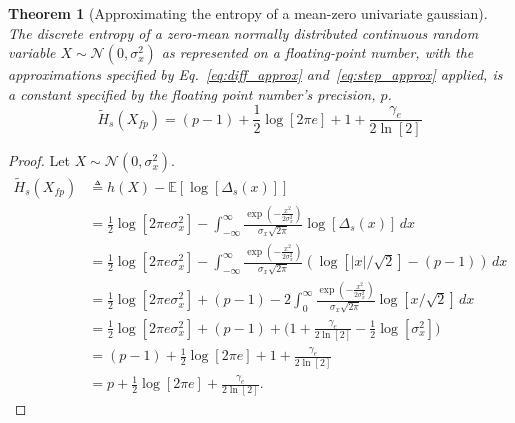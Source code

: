 \documentclass[12pt,onecolumn, margin=1in]{IEEEtran}
\newtheorem{theorem}{Theorem}[section]
\newcommand{\E}[1]{\mathbb{E}\left[ #1 \right]}
\newcommand{\Ht}{\tilde{H}}
\newcommand{\Xfp}{X_{fp}}
\begin{document}
\begin{theorem}[Approximating the entropy of a mean-zero univariate gaussian]
    \label{thm:single_gaussian}
    The discrete entropy of a zero-mean normally distributed continuous random variable $X \sim \mathcal{N}(0, \sigma_x^2)$ as represented on a floating-point number, with the approximations specified by Eq.~\eqref{eq:diff_approx} and~\eqref{eq:step_approx} applied, is a constant specified by the floating point number's precision, $p$.
    \begin{equation}
        \tilde H_s(X_{fp}) = (p-1) + \frac{1}{2} \log[2 \pi e] + 1 + \frac{\gamma_e}{2\ln[2]}
    \end{equation}
    
\end{theorem}
\begin{proof}
    Let $X \sim \mathcal{N}(0, \sigma_x^2)$.
    \begin{equation}
    \begin{aligned}
    \label{eq:1d-0m-fp}
        \Ht_{s}(\Xfp) &\triangleq h(X) - \E{\log[\Delta_s(x)]} \\
        &= \frac{1}{2}\log[2\pi e \sigma^2_x] - \int^{\infty}_{-\infty} \frac{\exp(-\frac{x^2}{2\sigma_x^2})}{\sigma_x \sqrt{2\pi}} \log [\Delta_s(x)] \, dx  \\
        &= \frac{1}{2}\log[2\pi e \sigma^2_x] - \int^{\infty}_{-\infty} \frac{\exp(-\frac{x^2}{2\sigma_x^2})}{\sigma_x \sqrt{2\pi}} (\log[|x|/\sqrt{2}] - (p - 1)) \, dx \\
        & = \frac{1}{2}\log[2\pi e \sigma^2_x] + (p - 1) - 2\int^{\infty}_0 \frac{\exp(-\frac{x^2}{2\sigma_x^2})}{\sigma_x \sqrt{2\pi}} \log[x/\sqrt{2}] \, dx\\
        & = \frac{1}{2}\log[2\pi e \sigma^2_x] + (p-1) + \bigg(1 + \frac{\gamma_e}{2\ln[2]} -\frac{1}{2} \log[\sigma^2_x] \bigg)\\
        & = (p-1) + \frac{1}{2} \log[2 \pi e] + 1 + \frac{\gamma_e}{2\ln[2]}\\
        & = p + \frac{1}{2} \log[2 \pi e] + \frac{\gamma_e}{2\ln[2]}.
    \end{aligned}
\end{equation}
\end{proof}
\end{document}
